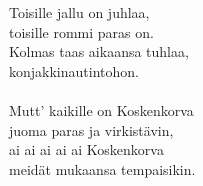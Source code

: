 
            Toisille jallu on juhlaa, \\
            toisille rommi paras on. \\
            Kolmas taas aikaansa tuhlaa, \\
            konjakkinautintohon. \\
\hspace{10mm} \\
            Mutt’ kaikille on Koskenkorva \\
            juoma paras ja virkistävin, \\
            ai ai ai ai ai Koskenkorva \\
            meidät mukaansa tempaisikin. \\
